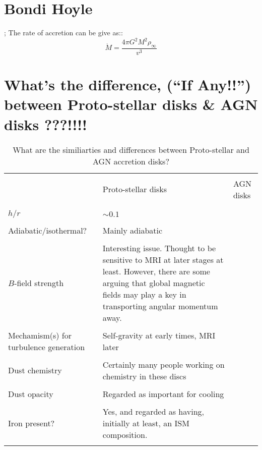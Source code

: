 \documentclass[11pt,a4paper]{article}
\begin{document}
\section{Bondi Hoyle}
\citet{Bondi_Hoyle1944};
The rate of accretion can be give as::
\begin{equation}
\dot{M} = \frac{4 \pi G^2 M^2 \rho_{\infty}}{v^3}
\end{equation}



\section{What's the difference, (``If Any!!'') between Proto-stellar disks \& AGN disks ???!!!!}
\begin{landscape}
\begin{table}[]
  \centering
  \caption{What are the similiarties and differences between 
    Proto-stellar and AGN accretion disks?
}
  \label{my-label}
  \begin{tabular}{  p{65mm}   p{70mm}  p{70mm} }
    \hline
    \hline
 &  &  \\
                              & Proto-stellar disks & AGN disks \\
 &  &  \\
        \hline
 &  &  \\
    $h/r$                              & $\sim0.1$    &   \\
 &  &  \\
    Adiabatic/isothermal?      &  Mainly adiabatic &  \\
 &  &  \\
    $B$-field strength             &  Interesting issue.  Thought to be sensitive to MRI at later stages at least.  
                                               However, there are some arguing that global magnetic fields may play a key in transporting angular momentum away.  &  \\
 &  &  \\
      Mechamism(s) for  turbulence generation           &  Self-gravity at early times,  MRI later &    \\
           &  &  \\
Dust chemistry                       &  Certainly many people working on chemistry in these discs
&  \\
 &  &  \\
Dust opacity                        &  Regarded as important for cooling&  \\
 &  &  \\
Iron present?                        & Yes, and regarded as having, initially at least, an ISM composition. &  \\
 &  &  \\
    \hline
    \hline
\end{tabular}
\end{table}
\end{landscape}
\end{document}
